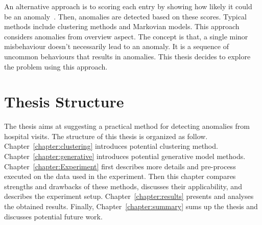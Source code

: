 An alternative approach is to scoring each entry by showing how likely it could be an anomaly~\cite{gupta2014outlier}. Then, anomalies are detected based on these scores. Typical methods include clustering methods and Markovian models. This approach considers anomalies from overview aspect. The concept is that, a single minor misbehaviour doesn't necessarily lead to an anomaly. It is a sequence of uncommon behaviours that results in anomalies. This thesis decides to explore the problem using this approach.

\section{Thesis Structure}
The thesis aims at suggesting a practical method for detecting anomalies from hospital visits. The structure of this thesis is organized as follow. Chapter~\ref{chapter:clustering} introduces potential clustering method. Chapter~\ref{chapter:generative} introduces potential generative model methods. Chapter~\ref{chapter:Experiment} first describes more details and pre-process executed on the data used in the experiment. Then this chapter compares strengths and drawbacks of these methods, discusses their applicability, and describes the experiment setup. Chapter~\ref{chapter:results} presents and analyses the obtained results. Finally, Chapter~\ref{chapter:summary} sums up the thesis and discusses potential future work.